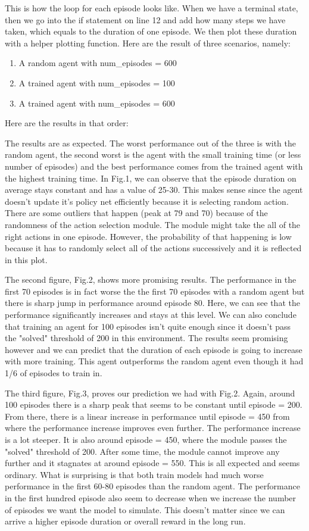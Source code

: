 \documentclass{article}
\numberwithin{equation}{section}
\numberwithin{equation}{section}
\begin{document}
This is how the loop for each episode looks like. When we have a terminal state, then we go into the if statement on line 12 and add how many steps we have taken, which equals to the duration of one episode. We then plot these duration with a helper plotting function. Here are the result of three scenarios, namely:
\begin{enumerate}
\item A random agent with num\_episodes = 600
\item A trained agent with num\_episodes = 100
\item A trained agent with num\_episodes = 600
\end{enumerate}


Here are the results in that order:


The results are as expected. The worst performance out of the three is with the random agent, the second worst is the agent with the small training time (or less number of episodes) and the best performance comes from the trained agent with the highest training time. In Fig.1, we can observe that the episode duration on average stays constant and has a value of 25-30. This makes sense since the agent doesn't update it's policy net efficiently because it is selecting random action. There are some outliers that happen (peak at 79 and 70) because of the randomness of the action selection module. The module might take the all of the right actions in one episode. However, the probability of that happening is low because it has to randomly select all of the actions successively and it is reflected in this plot. 

The second figure, Fig.2, shows more promising results. The performance in the first 70 episodes is in fact worse the the first 70 episodes with a random agent but there is sharp jump in performance around episode 80. Here, we can see that the performance significantly increases and stays at this level. We can also conclude that training an agent for 100 episodes isn't quite enough since it doesn't pass the "solved" threshold of 200 in this environment. The results seem promising however and we can predict that the duration of each episode is going to increase with more training. This agent outperforms the random agent even though it had 1/6 of episodes to train in.

The third figure, Fig.3, proves our prediction we had with Fig.2. Again, around 100 episodes there is a sharp peak that seems to be constant until episode = 200. From there, there is a linear increase in performance until episode = 450 from where the performance increase improves even further. The performance increase is a lot steeper. It is also around episode = 450, where the module passes the "solved" threshold of 200. After some time, the module cannot improve any further and it stagnates at around episode = 550. This is all expected and seems ordinary. What is surprising is that both train models had much worse performance in the first 60-80 episodes than the random agent. The performance in the first hundred episode also seem to decrease when we increase the number of episodes we want the model to simulate. This doesn't matter since we can arrive a higher episode duration or overall reward in the long run.
\end{document}
